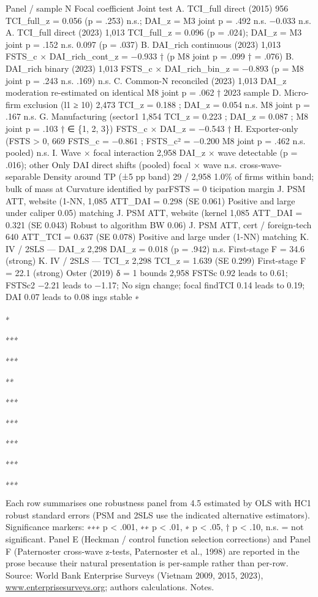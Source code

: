 \documentclass[12pt,a4paper]{article}
\begin{document}
Panel / sample N Focal coefficient Joint test A. TCI\_full direct (2015)
956 TCI\_full\_z = 0.056 (p = .253) n.s.; DAI\_z = M3 joint p = .492
n.s. −0.033 n.s. A. TCI\_full direct (2023) 1,013 TCI\_full\_z = 0.096
(p = .024); DAI\_z = M3 joint p = .152 n.s. 0.097 (p = .037) B.
DAI\_rich continuous (2023) 1,013 FSTS\_c × DAI\_rich\_cont\_z = −0.933
† (p M8 joint p = .099 † = .076) B. DAI\_rich binary (2023) 1,013
FSTS\_c × DAI\_rich\_bin\_z = −0.893 (p = M8 joint p = .243 n.s. .169)
n.s. C. Common-N reconciled (2023) 1,013 DAI\_z moderation re-estimated
on identical M8 joint p = .062 † 2023 sample D. Micro-firm exclusion (l1
≥ 10) 2,473 TCI\_z = 0.188 ; DAI\_z = 0.054 n.s. M8 joint p = .167 n.s.
G. Manufacturing (sector1 1,854 TCI\_z = 0.223 ; DAI\_z = 0.087 ; M8
joint p = .103 † ∈ \{1, 2, 3\}) FSTS\_c × DAI\_z = −0.543 † H.
Exporter-only (FSTS \textgreater{} 0, 669 FSTS\_c = −0.861 ; FSTS\_c² =
−0.200 M8 joint p = .462 n.s. pooled) n.s. I. Wave × focal interaction
2,958 DAI\_z × wave detectable (p = .016); other Only DAI direct shifts
(pooled) focal × wave n.s. cross-wave-separable Density around TP (±5 pp
band) 29 / 2,958 1.0\% of firms within band; bulk of mass at Curvature
identified by parFSTS = 0 ticipation margin J. PSM ATT, website (1-NN,
1,085 ATT\_DAI = 0.298 (SE 0.061) Positive and large under caliper 0.05)
matching J. PSM ATT, website (kernel 1,085 ATT\_DAI = 0.321 (SE 0.043)
Robust to algorithm BW 0.06) J. PSM ATT, cert / foreign-tech 640
ATT\_TCI = 0.637 (SE 0.078) Positive and large under (1-NN) matching K.
IV / 2SLS --- DAI\_z 2,298 DAI\_z = 0.018 (p = .942) n.s. First-stage F
= 34.6 (strong) K. IV / 2SLS --- TCI\_z 2,298 TCI\_z = 1.639 (SE 0.299)
First-stage F = 22.1 (strong) Oster (2019) δ = 1 bounds 2,958 FSTSc 0.92
leads to 0.61; FSTSc2 −2.21 leads to −1.17; No sign change; focal
findTCI 0.14 leads to 0.19; DAI 0.07 leads to 0.08 ings stable ∗

∗

∗∗∗

∗∗∗

∗∗

∗∗∗

∗∗∗

∗∗∗

∗∗∗

∗∗∗

Each row summarises one robustness panel from 4.5 estimated by OLS with
HC1 robust standard errors (PSM and 2SLS use the indicated alternative
estimators). Significance markers: ∗∗∗ p \textless{} .001, ∗∗ p
\textless{} .01, ∗ p \textless{} .05, † p \textless{} .10, n.s. = not
significant. Panel E (Heckman / control function selection corrections)
and Panel F (Paternoster cross-wave z-tests, Paternoster et al., 1998)
are reported in the prose because their natural presentation is
per-sample rather than per-row. Source: World Bank Enterprise Surveys
(Vietnam 2009, 2015, 2023),
\href{http://www.enterprisesurveys.org;}{www.enterprisesurveys.org;}
authors\textquotesingle{} calculations. Notes.
\end{document}
